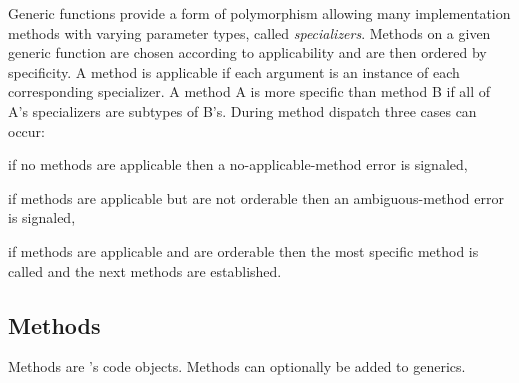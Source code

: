 \documentclass[twoside,twocolumn,9pt]{extarticle}
\begin{document}
Generic functions provide a form of polymorphism allowing many
implementation methods with varying parameter types, called
{\it specializers}.  Methods on a given generic function are chosen
according to applicability and are then ordered by specificity.
A method is applicable if each argument is an instance of each
corresponding specializer.
A method A is more specific than method B
if all of A's specializers are subtypes of B's.  
During method dispatch three cases can occur:
\begin{packeditemize}
\item if no methods are applicable then a no-applicable-method error
is signaled,
\item if methods are applicable but are not orderable then an
ambiguous-method error is signaled,
\item if methods are applicable and are orderable then the most
specific method is called and the next methods are established.
\end{packeditemize}

\begin{defs}
\end{defs}

\subsection{Methods}

Methods are \goo's code objects.  Methods can optionally be added to
generics. 

\begin{defs}
\end{defs}
\end{document}
